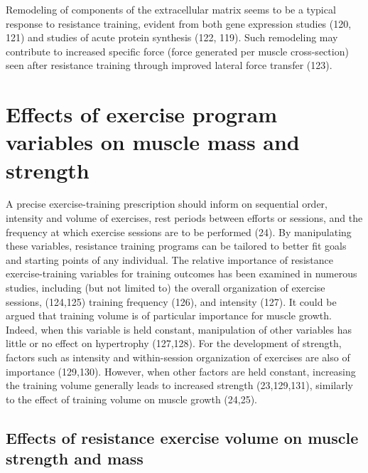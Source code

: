 \documentclass[twoside,10pt]{gihclass} %
\begin{document}
Remodeling of components of the extracellular matrix seems to be a typical response to resistance training, evident from both gene expression studies
(120, 121)
and studies of acute protein synthesis
(122, 119).
Such remodeling may contribute to increased specific force (force generated per muscle cross-section) seen after resistance training through improved lateral force transfer
(123).

\hypertarget{effects-of-exercise-program-variables-on-muscle-mass-and-strength}{%
\section{Effects of exercise program variables on muscle mass and strength}\label{effects-of-exercise-program-variables-on-muscle-mass-and-strength}}

A precise exercise-training prescription should inform on sequential order, intensity and volume of exercises, rest periods between efforts or sessions, and the frequency at which exercise sessions are to be performed
(24).
By manipulating these variables, resistance training programs can be tailored to better fit goals and starting points of any individual.
The relative importance of resistance exercise-training variables for training outcomes has been examined in numerous studies, including (but not limited to) the overall organization of exercise sessions,
(124,125)
training frequency
(126),
and intensity
(127).
It could be argued that training volume is of particular importance for muscle growth.
Indeed, when this variable is held constant, manipulation of other variables has little or no effect on hypertrophy
(127,128).
For the development of strength, factors such as intensity and within-session organization of exercises are also of importance
(129,130).
However, when other factors are held constant, increasing the training volume generally leads to increased strength
(23,129,131),
similarly to the effect of training volume on muscle growth
(24,25).

\hypertarget{effects-of-resistance-exercise-volume-on-muscle-strength-and-mass}{%
\subsection{Effects of resistance exercise volume on muscle strength and mass}\label{effects-of-resistance-exercise-volume-on-muscle-strength-and-mass}}
\end{document}
